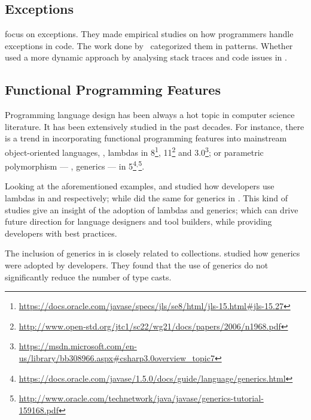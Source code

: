\subsection*{\textbf{Exceptions}}

\cite{kery_examining_2016,asaduzzaman_how_2016} focus on exceptions. 
They made empirical studies on how programmers handle exceptions in \java{} code. 
The work done by~\cite{nakshatri_analysis_2016} categorized them in patterns. 
Whether~\cite{coelho_unveiling_2015} used a more dynamic approach by analysing stack traces and code issues in \github{}. 

\subsection*{\textbf{Functional Programming Features}}

Programming language design has been always a hot topic in computer science literature.
It has been extensively studied in the past decades.
For instance, there is a trend in incorporating functional programming features into mainstream object-oriented languages, \eg, lambdas in \java{} 8\footnote{\url{https://docs.oracle.com/javase/specs/jls/se8/html/jls-15.html\#jls-15.27}}, \cpp{}11\footnote{\url{http://www.open-std.org/jtc1/sc22/wg21/docs/papers/2006/n1968.pdf}} and \cs{} 3.0\footnote{\url{https://msdn.microsoft.com/en-us/library/bb308966.aspx\#csharp3.0overview\_topic7}}; or parametric polymorphism --- \ie{}, generics --- in \java{} 5\footnote{\url{https://docs.oracle.com/javase/1.5.0/docs/guide/language/generics.html}}\(^{,}\)\footnote{\url{http://www.oracle.com/technetwork/java/javase/generics-tutorial-159168.pdf}}.

Looking at the aforementioned examples, \cite{mazinanian_understanding_2017} and \cite{uesbeck_empirical_2016} studied how developers use lambdas in \java{} and \cpp{} respectively; while \cite{parnin_java_2011,parnin_adoption_2013} did the same for generics in \java{}.
This kind of studies give an insight of the adoption of lambdas and generics; which can drive future direction for language designers and tool builders, while providing developers with best practices.




The inclusion of generics in \java{} is closely related to collections. 
\cite{parnin_java_2011,parnin_adoption_2013} studied how generics were adopted by \java{} developers. 
They found that the use of generics do not significantly reduce the number of type casts. 

